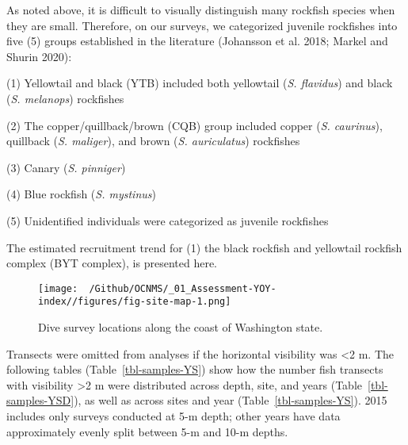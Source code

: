\documentclass[
  letterpaper,
  DIV=11,
  numbers=noendperiod]{scrartcl}
\begin{document}
As noted above, it is difficult to visually distinguish many rockfish
species when they are small. Therefore, on our surveys, we categorized
juvenile rockfishes into five (5) groups established in the literature
(Johansson et al. 2018; Markel and Shurin 2020):

(1) Yellowtail and black (YTB) included both yellowtail (\emph{S.
flavidus}) and black (\emph{S. melanops}) rockfishes

(2) The copper/quillback/brown (CQB) group included copper (\emph{S.
caurinus}), quillback (\emph{S. maliger}), and brown (\emph{S.
auriculatus}) rockfishes

(3) Canary (\emph{S. pinniger})

(4) Blue rockfish (\emph{S. mystinus})

(5) Unidentified individuals were categorized as juvenile rockfishes

The estimated recruitment trend for (1) the black rockfish and
yellowtail rockfish complex (BYT complex), is presented here.

\begin{figure}[H]

{\centering \texttt{[image: ~/Github/OCNMS/\_01\_Assessment-YOY-index//figures/fig-site-map-1.png]}

}

\caption{\label{fig-site-map}Dive survey locations along the coast of
Washington state.}

\end{figure}

Transects were omitted from analyses if the horizontal visibility was
\textless2 m. The following tables (Table~\ref{tbl-samples-YS}) show how
the number fish transects with visibility \textgreater2 m were
distributed across depth, site, and years (Table~\ref{tbl-samples-YSD}),
as well as across sites and year (Table~\ref{tbl-samples-YS}). 2015
includes only surveys conducted at 5-m depth; other years have data
approximately evenly split between 5-m and 10-m depths.
\end{document}
